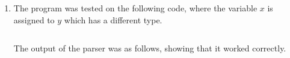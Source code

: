\documentclass[12pt]{article}
\begin{document}
\begin{enumerate}[label = \Roman*.]
\item The program was tested on the following code, where the variable $x$ is assigned to $y$ which has a different type.
\inputminted[xleftmargin = -20pt, xrightmargin = -20pt, frame = single, linenos]{c}{samples/input_4.c}
The output of the parser was as follows, showing that it worked correctly.
\inputminted[xleftmargin = -20pt, xrightmargin = -20pt, frame = single, linenos]{python}{samples/output_4.txt}
\end{enumerate}
\end{document}
